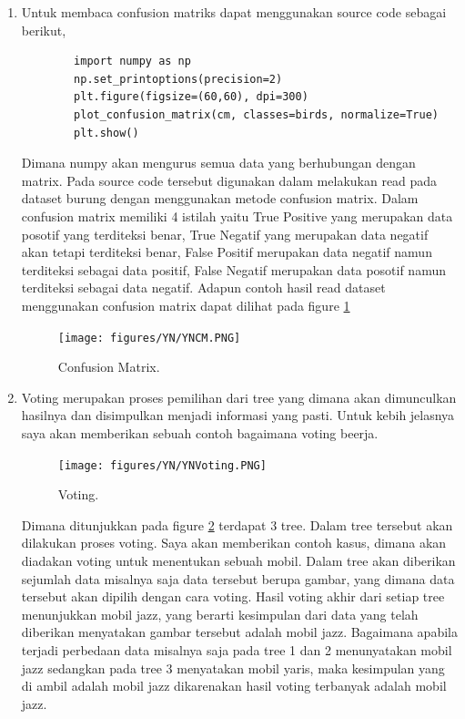 \begin{enumerate}
\item Untuk membaca confusion matriks dapat menggunakan source code sebagai berikut,
	\begin{verbatim}
		import numpy as np
		np.set_printoptions(precision=2)
		plt.figure(figsize=(60,60), dpi=300)
		plot_confusion_matrix(cm, classes=birds, normalize=True)
		plt.show()
	\end{verbatim}

Dimana numpy akan mengurus semua data yang berhubungan dengan matrix. Pada source code tersebut digunakan dalam melakukan read pada dataset burung dengan menggunakan metode confusion matrix. Dalam confusion matrix memiliki 4 istilah yaitu True Positive yang merupakan data posotif yang terditeksi benar, True Negatif yang merupakan data negatif akan tetapi terditeksi benar, False Positif merupakan data negatif namun terditeksi sebagai data positif, False Negatif merupakan data posotif namun terditeksi sebagai data negatif. Adapun contoh hasil read dataset menggunakan confusion matrix dapat dilihat pada figure \ref{YNCM}
	
	\begin{figure}[ht]
	\centerline{\texttt{[image: figures/YN/YNCM.PNG]}}
	\caption{Confusion Matrix.}
	\label{YNCM}
	\end{figure}

\item Voting merupakan proses pemilihan dari tree yang dimana akan dimunculkan hasilnya dan disimpulkan menjadi informasi yang pasti. Untuk kebih jelasnya saya akan memberikan sebuah contoh bagaimana voting beerja.
	
	\begin{figure}[ht]
	\centerline{\texttt{[image: figures/YN/YNVoting.PNG]}}
	\caption{Voting.}
	\label{YNV}
	\end{figure}

Dimana ditunjukkan pada figure \ref{YNV} terdapat 3 tree. Dalam tree tersebut akan dilakukan proses voting. Saya akan memberikan contoh kasus, dimana akan diadakan voting untuk menentukan sebuah mobil. Dalam tree akan diberikan sejumlah data misalnya saja data tersebut berupa gambar, yang dimana data tersebut akan dipilih dengan cara voting. Hasil voting akhir dari setiap tree menunjukkan mobil jazz, yang berarti kesimpulan dari data yang telah diberikan menyatakan gambar tersebut adalah mobil jazz. Bagaimana apabila terjadi perbedaan data misalnya saja pada tree 1 dan 2 menunyatakan mobil jazz sedangkan pada tree 3 menyatakan mobil yaris, maka kesimpulan yang di ambil adalah mobil jazz dikarenakan hasil voting terbanyak adalah mobil jazz.

\end{enumerate}


